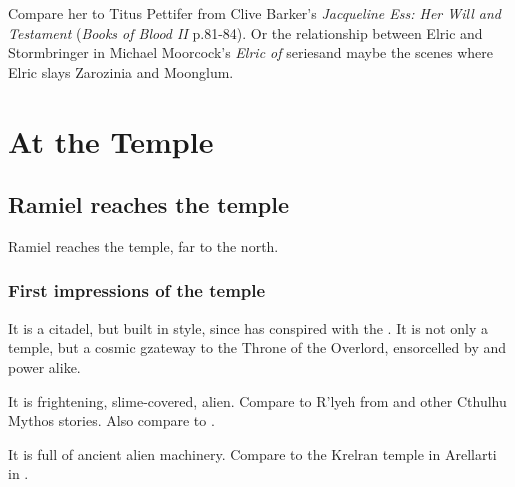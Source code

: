Compare her to Titus Pettifer from Clive Barker's \emph{Jacqueline Ess: Her Will and Testament} (\emph{Books of Blood II} p.81-84). Or the relationship between Elric and Stormbringer in Michael Moorcock's \emph{Elric of \Melnibone} series\dash and maybe the scenes where Elric slays Zarozinia and Moonglum. 















\section{At the Temple}
\subsection{Ramiel reaches the temple}
Ramiel reaches the temple, far to the north. 





\subsubsection{First impressions of the temple}
It is a \Mystraacht{} citadel, but built in \ophidian{} style, since \Mystraacht{} has conspired with the \ophidians. 
It is not only a temple, but a cosmic gzateway to the Throne of the \Mystraacht{} Overlord, ensorcelled by \resphan{} and \ophidian{} power alike. 

It is frightening, slime-covered, alien. 
Compare to R'lyeh from \cite{HPLovecraft:TheCallofCthulhu} and other Cthulhu Mythos stories. 
Also compare to \cite[p.22--25]{TanakaHirofumi:TheSecretMemoiroftheMissionary}.

It is full of ancient alien machinery. 
Compare to the Krelran temple in Arellarti in \cite[p.49]{KarlEdwardWagner:Bloodstone}. 


